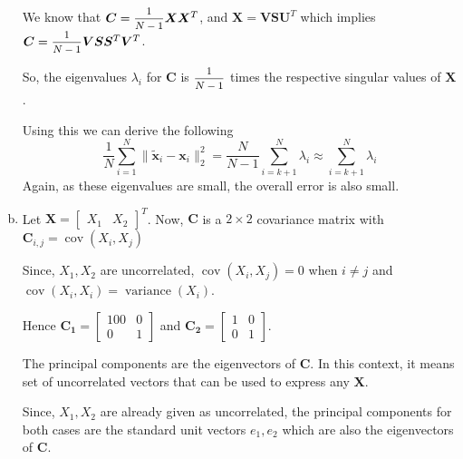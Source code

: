 \documentclass[a4paper]{article}
\begin{document}
\begin{enumerate}[(a)]
We know that $\bm{C} =\mfrac{1}{N-1}\bm{X}\bm{X}^T$, and $\bm{X}=\bm{V}\bm{S}\bm{U}^T$ which implies $\bm{C}=\mfrac{1}{N-1}\bm{V}\bm{S}\bm{S}^T\bm{V}^T$.

So, the eigenvalues $\lambda_i$ for $\bm{C}$ is $\mfrac{1}{N-1}$ times the respective singular values of $\bm{X}$.

Using this we can derive the following
\begin{equation}
	\frac{1}{N}\sum_{i=1}^{N}\|\bm{\tilde{x}}_i-\bm{x}_i\|_2^2 = \frac{N}{N-1}\sum_{i=k+1}^{N}\lambda_i\approx\sum_{i=k+1}^{N}\lambda_i
\end{equation}
Again, as these eigenvalues are small, the overall error is also small.
\item 
Let $\bm{X}=\begin{bmatrix}X_1 & X_2\end{bmatrix}^T$. Now, $\bm{C}$ is a $2\times2$ covariance matrix with $\bm{C}_{i,j}=\operatorname{cov}(X_i, X_j)$

Since, $X_1, X_2$ are uncorrelated, $\operatorname{cov}(X_i, X_j)=0$ when $i\neq j$ and $\operatorname{cov}(X_i, X_i)=\operatorname{variance}(X_i)$.

Hence $\bm{C_1}=\begin{bmatrix}100 & 0\\0&1\end{bmatrix}$ and $\bm{C_2}=\begin{bmatrix}1 & 0\\0&1\end{bmatrix}$.

The principal components are the eigenvectors of $\bm{C}$. In this context, it means set of uncorrelated vectors that can be used to express any $\bm{X}$.

Since, $X_1, X_2$ are already given as uncorrelated, the principal components for both cases are the standard unit vectors $e_1, e_2$ which are also the eigenvectors of  $\bm{C}$.
\end{enumerate}
\end{document}
